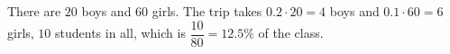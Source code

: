 There are $20$ boys and $60$ girls. The trip takes $0.2\cdot20=4$ boys and $0.1\cdot60=6$ girls, $10$ students in all, which is $\dfrac{10}{80}=\boxed{12.5\%}$ of the class.
